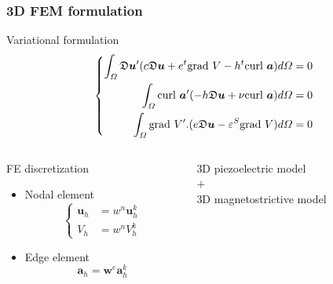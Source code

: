 \documentclass[compress]{beamer}
\begin{document}
\begin{frame}\frametitle{3D FEM formulation}
\begin{exampleblock}{Variational formulation} 
   \begin{equation*}
	\left\{ 
	\begin{aligned}
	\int_{\mathnormal{\Omega}} \mathfrak{D} \boldsymbol{\mathnormal{u}}'(\mathnormal{c}\mathfrak{D}\boldsymbol{\mathnormal{u}} + e^t \text{grad } V -\mathnormal{h}^t \text{curl } \boldsymbol{\mathnormal{a}})\mathnormal{d}\mathnormal{\Omega} & = 0 \\
	\int_{\mathnormal{\Omega}} \text{curl } \boldsymbol{\mathnormal{a}}'(-\mathnormal{h}\mathfrak{D}\boldsymbol{\mathnormal{u}}+\nu \text{curl } \boldsymbol{\mathnormal{a}}) \mathnormal{d}\mathnormal{\Omega} & = 0 \\
	\int_{\mathnormal{\Omega}} \text{grad } V'.(e\mathfrak{D}\boldsymbol{\mathnormal{u}} - \varepsilon^S \text{grad } V) \mathnormal{d}\mathnormal{\Omega} & = 0
	\end{aligned}
	\right.
\end{equation*}
\end{exampleblock}	

\begin{columns}[totalwidth=\textwidth] 
   \begin{column}{.45\textwidth}
\begin{exampleblock}{FE discretization} 
   \begin{itemize}[label=$\bullet$, font=\small, leftmargin=*]
	\item Nodal element \vspace*{-0.5\baselineskip}
	\begin{equation*}
	\left\{ 
	\begin{aligned}
	\boldsymbol{u}_h & = w^n \boldsymbol{u}_h^k \\
	V_h & = w^n V_h^k
	\end{aligned}
	\right.
	\end{equation*}
	\item Edge element \vspace*{-\baselineskip}
	\begin{equation*}
	\boldsymbol{a}_h=\boldsymbol{w}^e \boldsymbol{a}_h^k
	\end{equation*}
	\end{itemize}
\end{exampleblock}
\end{column}
\begin{column}{.5\textwidth}
\begin{exampleblock}{} 
  \centering
 3D piezoelectric model \\ [0.1cm]
 {\color{red} \Large$\mathbf{\boldsymbol{+}}$} \\ [0.1cm]
  3D magnetostrictive model
  \end{exampleblock}
\end{column}
\end{columns}	
\end{frame}
\end{document}
